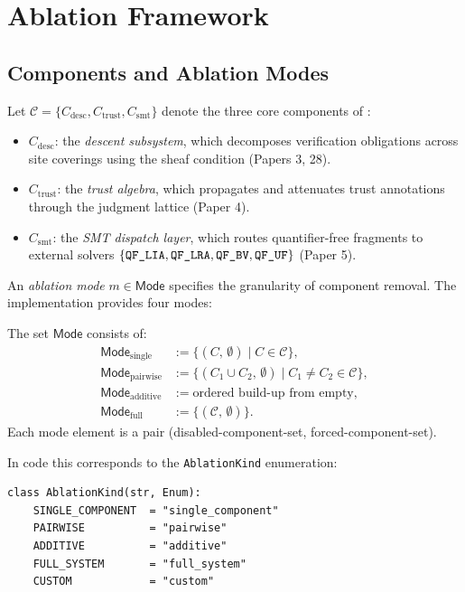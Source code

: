 \documentclass[11pt]{article}
\newcommand{\CompSet}{\mathcal{C}}          %
\newcommand{\AblMode}{\mathsf{Mode}}        %
\newcommand{\DescComp}{C_{\mathrm{desc}}}   %
\newcommand{\TrustComp}{C_{\mathrm{trust}}} %
\newcommand{\SMTComp}{C_{\mathrm{smt}}}     %
\begin{document}
\section{Ablation Framework}
\label{sec:ablation-framework}

\subsection{Components and Ablation Modes}
\label{subsec:components}

Let $\CompSet = \{\DescComp, \TrustComp, \SMTComp\}$ denote the three
core components of \JuGeo:
\begin{itemize}
\item $\DescComp$: the \emph{descent subsystem}, which decomposes
  verification obligations across site coverings using the sheaf
  condition (Papers 3, 28).
\item $\TrustComp$: the \emph{trust algebra}, which propagates and
  attenuates trust annotations through the judgment lattice (Paper 4).
\item $\SMTComp$: the \emph{SMT dispatch layer}, which routes
  quantifier-free fragments to external solvers
  $\{\texttt{QF\_LIA}, \texttt{QF\_LRA}, \texttt{QF\_BV}, \texttt{QF\_UF}\}$ (Paper 5).
\end{itemize}

An \emph{ablation mode} $m \in \AblMode$ specifies the granularity of
component removal.  The implementation provides four modes:

\begin{definition}
\label{def:ablation-mode}
The set $\AblMode$ consists of:
\begin{align*}
\AblMode_{\mathrm{single}}  &:= \{(C,\,\emptyset) \mid C \in \CompSet\},\\
\AblMode_{\mathrm{pairwise}}&:= \{(C_1 \cup C_2,\,\emptyset) \mid C_1 \neq C_2 \in \CompSet\},\\
\AblMode_{\mathrm{additive}} &:= \text{ordered build-up from empty},\\
\AblMode_{\mathrm{full}}    &:= \{(\CompSet,\,\emptyset)\}.
\end{align*}
Each mode element is a pair (disabled-component-set, forced-component-set).
\end{definition}

In code this corresponds to the \texttt{AblationKind} enumeration:
\begin{lstlisting}[style=jugeo-python,caption={AblationKind enumeration (models.py)}]
class AblationKind(str, Enum):
    SINGLE_COMPONENT  = "single_component"
    PAIRWISE          = "pairwise"
    ADDITIVE          = "additive"
    FULL_SYSTEM       = "full_system"
    CUSTOM            = "custom"
\end{lstlisting}
\end{document}
